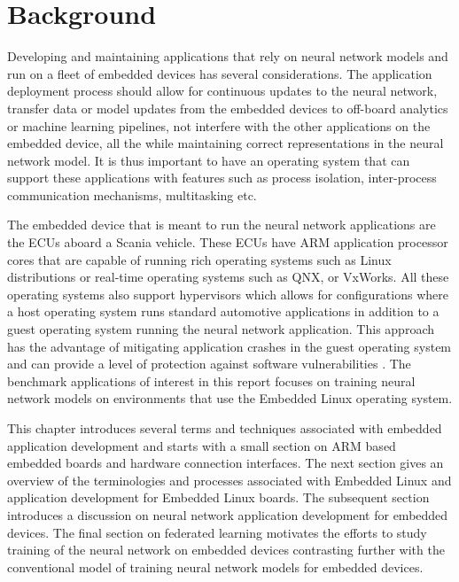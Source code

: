 
\chapter{Background}

Developing and maintaining applications that rely on neural network models and run on a fleet of embedded devices has several considerations. The application deployment process should allow for continuous updates to the neural network, transfer data or model updates from the embedded devices to off-board analytics or machine learning pipelines, not interfere with the other applications on the embedded device, all the while maintaining correct representations in the neural network model. It is thus important to have an operating system that can support these applications with features such as process isolation, inter-process communication mechanisms, multitasking etc.

The embedded device that is meant to run the neural network applications are the ECUs aboard a Scania vehicle. These ECUs have ARM application processor cores that are capable of running rich operating systems such as Linux distributions or real-time operating systems such as QNX, or VxWorks. All these operating systems also support hypervisors which allows for configurations where a host operating system runs standard automotive applications in addition to a guest operating system running the neural network application. This approach has the advantage of mitigating application crashes in the guest operating system and can provide a level of protection against software vulnerabilities \cite{Linux-guest-os}. The benchmark applications of interest in this report focuses on training neural network models on environments that use the Embedded Linux operating system.

This chapter introduces several terms and techniques associated with embedded application development and starts with a small section on ARM based embedded boards and hardware connection interfaces. The next section gives an overview of the terminologies and processes associated with Embedded Linux and application development for Embedded Linux boards. The subsequent section introduces a discussion on neural network application development for embedded devices. The final section on federated learning motivates the efforts to study training of the neural network on embedded devices contrasting further with the conventional model of training neural network models for embedded devices.

